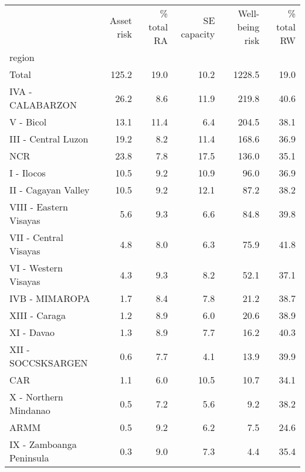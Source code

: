 \begin{tabular}{lrrrrr}
\toprule
{} &  Asset risk &  \% total RA &  SE capacity &  Well-being risk &  \% total RW \\
region                   &             &             &              &                  &             \\
\midrule
Total                    &       125.2 &        19.0 &         10.2 &           1228.5 &        19.0 \\
IVA - CALABARZON         &        26.2 &         8.6 &         11.9 &            219.8 &        40.6 \\
V - Bicol                &        13.1 &        11.4 &          6.4 &            204.5 &        38.1 \\
III - Central Luzon      &        19.2 &         8.2 &         11.4 &            168.6 &        36.9 \\
NCR                      &        23.8 &         7.8 &         17.5 &            136.0 &        35.1 \\
I - Ilocos               &        10.5 &         9.2 &         10.9 &             96.0 &        36.9 \\
II - Cagayan Valley      &        10.5 &         9.2 &         12.1 &             87.2 &        38.2 \\
VIII - Eastern Visayas   &         5.6 &         9.3 &          6.6 &             84.8 &        39.8 \\
VII - Central Visayas    &         4.8 &         8.0 &          6.3 &             75.9 &        41.8 \\
VI - Western Visayas     &         4.3 &         9.3 &          8.2 &             52.1 &        37.1 \\
IVB - MIMAROPA           &         1.7 &         8.4 &          7.8 &             21.2 &        38.7 \\
XIII - Caraga            &         1.2 &         8.9 &          6.0 &             20.6 &        38.9 \\
XI - Davao               &         1.3 &         8.9 &          7.7 &             16.2 &        40.3 \\
XII - SOCCSKSARGEN       &         0.6 &         7.7 &          4.1 &             13.9 &        39.9 \\
CAR                      &         1.1 &         6.0 &         10.5 &             10.7 &        34.1 \\
X - Northern Mindanao    &         0.5 &         7.2 &          5.6 &              9.2 &        38.2 \\
ARMM                     &         0.5 &         9.2 &          6.2 &              7.5 &        24.6 \\
IX - Zamboanga Peninsula &         0.3 &         9.0 &          7.3 &              4.4 &        35.4 \\
\bottomrule
\end{tabular}
